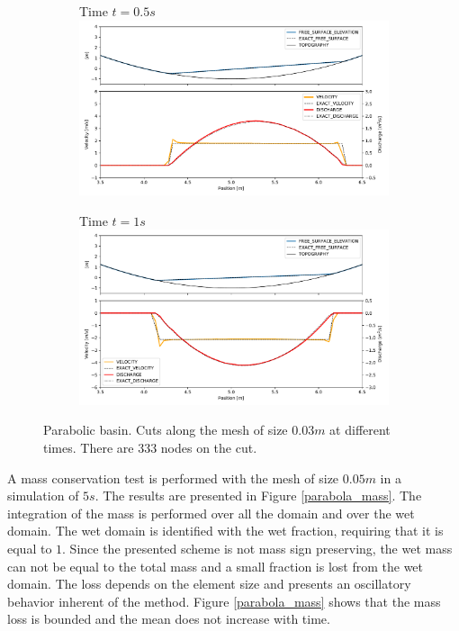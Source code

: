 \begin{figure}[H]
\begin{subfigure}{\textwidth}
    \centering
    Time $t=0.5s$
    \includegraphics[width=\textwidth]{img/eulerian/par/parabola_t0.5.pdf}
\end{subfigure}
\par\medskip
\begin{subfigure}{\textwidth}
    \centering
    Time $t=1s$
    \includegraphics[width=\textwidth]{img/eulerian/par/parabola_t1.0.pdf}
\end{subfigure}
\caption{Parabolic basin. Cuts along the mesh of size $0.03m$ at different times. There are 333 nodes on the cut.}
\label{parabola_graphic}
\end{figure}

A mass conservation test is performed with the mesh of size $0.05m$ in a simulation of $5s$. The results are presented in Figure \ref{parabola_mass}. The integration of the mass is performed over all the domain and over the wet domain. The wet domain is identified with the wet fraction, requiring that it is equal to $1$. Since the presented scheme is not mass sign preserving, the wet mass can not be equal to the total mass and a small fraction is lost from the wet domain. The loss depends on the element size and presents an oscillatory behavior inherent of the method. Figure \ref{parabola_mass} shows that the mass loss is bounded and the mean does not increase with time.


